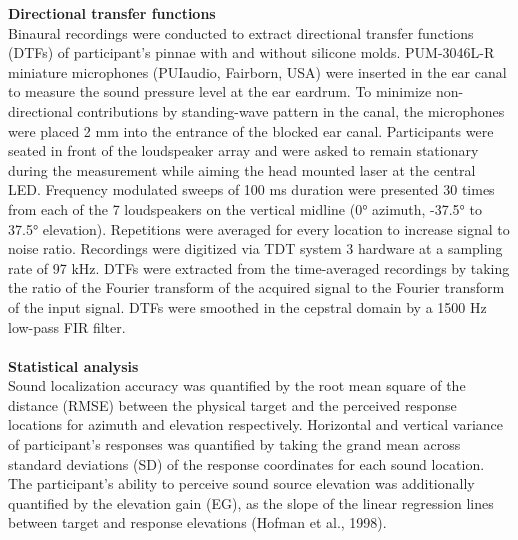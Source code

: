 \textbf{Directional transfer functions}\\
Binaural recordings were conducted to extract directional transfer functions (DTFs) of participant’s pinnae with and without silicone molds. PUM-3046L-R miniature microphones (PUIaudio, Fairborn, USA) were inserted in the ear canal to measure the sound pressure level at the ear eardrum. To minimize non-directional contributions by standing-wave pattern in the canal, the microphones were placed 2 mm into the entrance of the blocked ear canal. Participants were seated in front of the loudspeaker array and were asked to remain stationary during the measurement while aiming the head mounted laser at the central LED. Frequency modulated sweeps of 100 ms duration were presented 30 times from each of the 7 loudspeakers on the vertical midline (0° azimuth, -37.5° to 37.5° elevation). Repetitions were averaged for every location to increase signal to noise ratio. Recordings were digitized via TDT system 3 hardware at a sampling rate of 97 kHz. DTFs were extracted from the time-averaged recordings by taking the ratio of the Fourier transform of the acquired signal to the Fourier transform of the input signal. DTFs were smoothed in the cepstral domain by a 1500 Hz low-pass FIR filter. \\\\
\textbf{Statistical analysis}\\
Sound localization accuracy was quantified by the root mean square of the distance (RMSE) between the physical target and the perceived response locations for azimuth and elevation respectively. Horizontal and vertical variance of participant’s responses was quantified by taking the grand mean across standard deviations (SD) of the response coordinates for each sound location. The participant’s ability to perceive sound source elevation was additionally quantified by the elevation gain (EG), as the slope of the linear regression lines between target and response elevations (Hofman et al., 1998).\\\\
